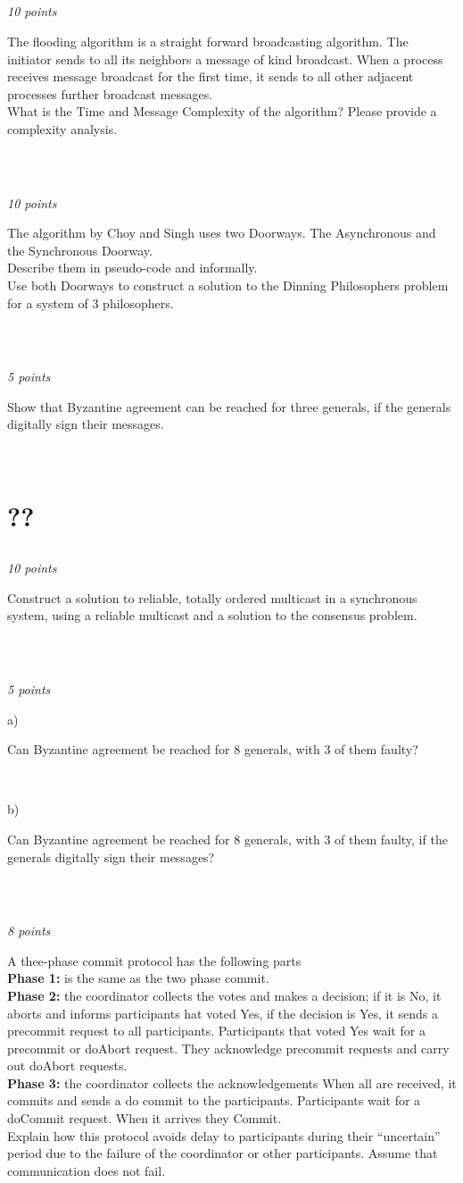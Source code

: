 \documentclass[a4paper]{article}
\newcommand{\points}[1]{\subsection{} \textit{#1 points}\\}
\newcommand{\question}[2][]{
  \noindent
  \parbox[t]{\textwidth}{#1 \parbox[t]{0.95\textwidth}{#2}}\\
}
\begin{document}
\points{10}
\question{The flooding algorithm is a straight forward broadcasting
  algorithm. The initiator sends to all its neighbors a message of
  kind broadcast. When a process receives message broadcast for the
  first time, it sends to all other adjacent processes further
  broadcast messages. \\ What is the Time and Message Complexity of
  the algorithm? Please provide a complexity analysis.}

\points{10}
\question{The algorithm by Choy and Singh uses two Doorways. The
  Asynchronous and the Synchronous Doorway. \\ Describe them in
  pseudo-code and informally. \\ Use both Doorways to construct a
  solution to the Dinning Philosophers problem for a system of 3
  philosophers.}

\points{5}
\question{Show that Byzantine agreement can be reached for three
  generals, if the generals digitally sign their messages.}

\section{??}
\points{10}
\question{Construct a solution to reliable, totally ordered multicast
  in a synchronous system, using a reliable multicast and a solution
  to the consensus problem.}

\points{5}
\question[a)]{Can Byzantine agreement be reached for 8 generals, with 3 of
  them faulty?}
\question[b)]{Can Byzantine agreement be reached for 8 generals, with 3 of
  them faulty, if the generals digitally sign their messages?}

\points{8}
\question{A thee-phase commit protocol has the following parts \\
  \textbf{Phase 1:} is the same as the two phase commit.\\
  \textbf{Phase 2:} the coordinator collects the votes and makes a
  decision; if it is No, it aborts and informs participants hat voted
  Yes, if the decision is Yes, it sends a precommit request to all
  participants. Participants that voted Yes wait for a precommit or
  doAbort request. They acknowledge precommit requests and carry out
  doAbort requests. \\
  \textbf{Phase 3:} the coordinator collects the acknowledgements When
  all are received, it commits and sends a do commit to the
  participants. Participants wait for a doCommit request. When it
  arrives they Commit. \\
  Explain how this protocol avoids delay to participants during their
  ``uncertain'' period due to the failure of the coordinator or other
  participants. Assume that communication does not fail.}
\end{document}
